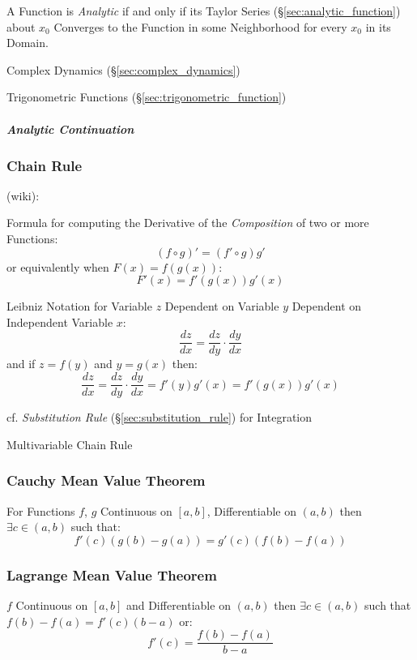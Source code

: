 A Function is \emph{Analytic} if and only if its Taylor Series
(\S\ref{sec:analytic_function}) about $x_0$ Converges to the Function in some
Neighborhood for every $x_0$ in its Domain.

Complex Dynamics (\S\ref{sec:complex_dynamics})

Trigonometric Functions (\S\ref{sec:trigonometric_function})



\subparagraph{Analytic Continuation}\label{sec:analytic_continuation}



\subsubsection{Chain Rule}\label{sec:chain_rule}

(wiki):

Formula for computing the Derivative of the \emph{Composition} of two or more
Functions:
\[
  (f \circ g)' = (f' \circ g) g'
\]
or equivalently when $F(x) = f(g(x))$:
\[
  F'(x) = f'(g(x))g'(x)
\]

Leibniz Notation for Variable $z$ Dependent on Variable $y$ Dependent on
Independent Variable $x$:
\[
  \frac{dz}{dx} = \frac{dz}{dy} \cdot \frac{dy}{dx}
\]
and if $z = f(y)$ and $y = g(x)$ then:
\[
  \frac{dz}{dx} = \frac{dz}{dy} \cdot \frac{dy}{dx}
    = f'(y)g'(x) = f'(g(x))g'(x)
\]

\fist cf. \emph{Substitution Rule} (\S\ref{sec:substitution_rule}) for
Integration

Multivariable Chain Rule



\subsubsection{Cauchy Mean Value Theorem}
\label{sec:cauchy_mean_value}

For Functions $f$, $g$ Continuous on $[a,b]$, Differentiable on
$(a,b)$ then $\exists c \in (a,b)$ such that:
\[
  f'(c) (g(b) - g(a)) = g'(c) (f(b) - f(a))
\]



\subsubsection{Lagrange Mean Value Theorem}
\label{sec:lagrange_mean_value}

$f$ Continuous on $[a,b]$ and Differentiable on $(a,b)$ then $\exists
c \in (a,b)$ such that $f(b) - f(a) = f'(c)(b-a)$ or:
\[
  f'(c) = \frac{f(b) - f(a)}{b - a}
\]



